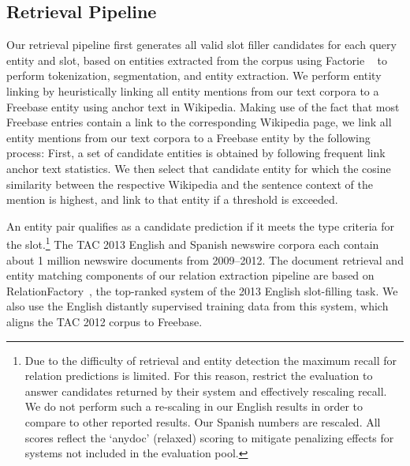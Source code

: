 
\subsection{Retrieval Pipeline \label{sec:pipeline}}
Our retrieval pipeline first generates all valid slot filler candidates for each query entity and slot, based on entities extracted from the corpus using {\sc Factorie} ~\citep{mccallum09:factorie:} to perform tokenization, segmentation, and entity extraction. We perform entity linking by heuristically linking all entity mentions from our text corpora to a Freebase entity using anchor text in Wikipedia. Making use of the fact that most Freebase entries contain a link to the corresponding Wikipedia page, we link all entity mentions from our text corpora to a Freebase entity by the following process:
First, a set of candidate entities is obtained by following frequent link anchor text statistics.
We then select that candidate entity for which the cosine similarity between the respective Wikipedia and the sentence context of the mention is highest, and link to that entity if a threshold is exceeded.

An entity pair qualifies as a candidate prediction if it meets the type criteria for the slot.\footnote{Due to the difficulty of retrieval and entity detection the maximum recall for relation predictions is limited. For this reason, \citet{surdeanu2012multi} restrict the evaluation to answer candidates returned by their system and effectively rescaling recall. We do not perform such a re-scaling in our English results in order to compare to other reported results. Our Spanish numbers are rescaled. All scores reflect the `anydoc' (relaxed) scoring to mitigate penalizing effects for systems not included in the evaluation pool.} The TAC 2013 English and Spanish newswire corpora each contain about 1 million newswire documents from 2009--2012. The document retrieval and entity matching components of our relation extraction pipeline are based on RelationFactory~\citep{roth2014relationfactory}, the top-ranked system of the 2013 English slot-filling task. We also use the English distantly supervised training data from this system, which aligns the TAC 2012 corpus to Freebase.

